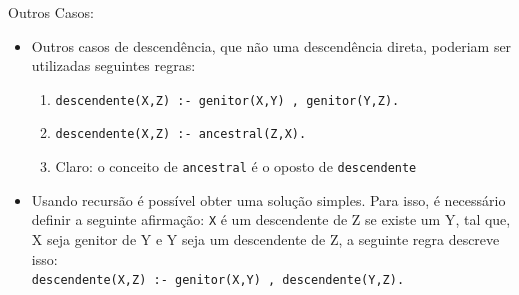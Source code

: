 \documentclass[sans]{beamer}
\begin{document}
\begin{frame}

\begin{block}{Outros Casos:}
\begin{itemize}
\itemsep 17pt

\item Outros casos de descendência, que não uma descendência direta, poderiam ser
utilizadas seguintes regras:


\begin{enumerate}
\item \texttt{descendente(X,Z) :- genitor(X,Y) , genitor(Y,Z).}

\item \texttt{descendente(X,Z) :- ancestral(Z,X).}

\item Claro: o conceito de \texttt{ancestral} é o oposto de \texttt{descendente}
\end{enumerate}

\item Usando recursão é possível obter uma
solução simples. Para isso, é
necessário definir a seguinte afirmação: \texttt{X} é um descendente de Z se existe um Y, tal que,
X seja genitor de Y e Y seja um descendente de Z, a seguinte regra descreve isso:\\
\texttt{descendente(X,Z) :- genitor(X,Y) , descendente(Y,Z).}



\end{itemize}
\end{block}   
\end{frame}

\end{document}
